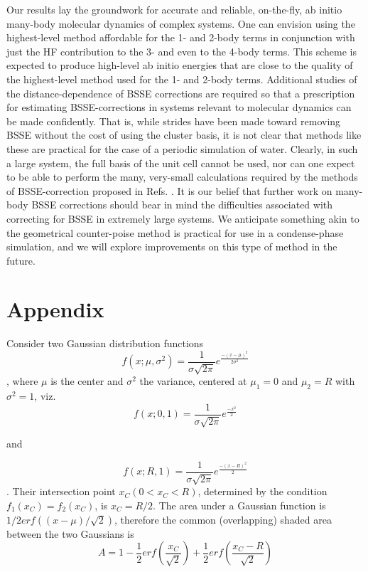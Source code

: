 \documentclass[11pt, proquest]{uwthesis}[2020/02/24]
\begin{document}
\par Our results lay the groundwork for accurate and reliable, on-the-fly, ab initio many-body molecular dynamics of complex systems. One can envision using the highest-level method affordable for the 1- and 2-body terms in conjunction with just the HF contribution to the 3- and even to the 4-body terms. This scheme is expected to produce high-level ab initio energies that are close to the quality of the highest-level method used for the 1- and 2-body terms. Additional studies of the distance-dependence of BSSE corrections are required so that a prescription for estimating BSSE-corrections in systems relevant to molecular dynamics can be made confidently. That is, while strides have been made toward removing BSSE without the cost of using the cluster basis,\autocite{richard_understanding_2018,ouyang_many-body_2015,mayer_many-body_2017} it is not clear that methods like these are practical for the case of a periodic simulation of water. Clearly, in such a large system, the full basis of the unit cell cannot be used, nor can one expect to be able to perform the many, very-small calculations required by the methods of BSSE-correction proposed in Refs. \cite{richard_understanding_2018,ouyang_many-body_2015,mayer_many-body_2017}. It is our belief that further work on many-body BSSE corrections should bear in mind the difficulties associated with correcting for BSSE in extremely large systems. We anticipate something akin to the geometrical counter-poise method\autocite{kruse_geometrical_2012} is practical for use in a condense-phase simulation, and we will explore improvements on this type of method in the future.

\section{Appendix}

Consider two Gaussian distribution functions 
$$f(x;\mu, \sigma^2)=\frac{1}{\sigma\sqrt{2\pi}}e^{\frac{-(x-\mu)^2}{2\sigma^2}}$$,
where $\mu$ is the center and $\sigma^2$ the variance, centered at $\mu_1=0$ and $\mu_2=R$ with $\sigma^2=1$, viz.
$$
f(x;0, 1)=\frac{1}{\sigma\sqrt{2\pi}}e^{\frac{-x^2}{2}}
$$

and

$$
f(x;R, 1)=\frac{1}{\sigma\sqrt{2\pi}}e^{\frac{-(x-R)^2}{2}}
$$
.
Their intersection point $x_C(0<x_C<R)$, determined by the condition $f_1(x_C)=f_2(x_C)$, is $x_C=R/2$. The area under a Gaussian function is $1/2erf((x-\mu)/\sqrt{2})$, therefore the common (overlapping) shaded area  between the two Gaussians is
$$
A=1-\frac{1}{2}erf\left(\frac{x_C}{\sqrt{2}}\right)+\frac{1}{2}erf\left(\frac{x_C-R}{\sqrt{2}}\right)
$$
\end{document}
